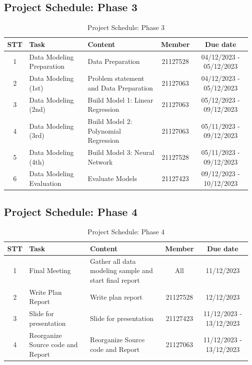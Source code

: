 \documentclass[13pt]{article}
\begin{document}
\subsection{Project Schedule: Phase 3}
\begin{table}[H]
    \centering
    \begin{tabular}{|c|p{4cm}|p{5cm}|c|c|}
    \hline
       \textbf{STT} & \textbf{Task} & \textbf{Content} & \textbf{Member} & \textbf{Due date}\\
    \hline
        1 & Data Modeling Preparation & Data Preparation & 21127528 & 04/12/2023 - 05/12/2023\\
    \hline
        2 & Data Modeling (1st) & Problem statement and Data Preparation & 21127063 & 04/12/2023 - 05/12/2023\\
    \hline
        3 & Data Modeling (2nd) & Build Model 1: Linear Regression & 21127063 & 05/12/2023 - 09/12/2023\\
    \hline
        4 & Data Modeling (3rd) & Build Model 2: Polynomial Regression & 21127063 & 05/11/2023 - 09/12/2023\\
    \hline
        5 & Data Modeling (4th) & Build Model 3: Neural Network & 21127528 & 05/11/2023 - 09/12/2023\\
    \hline
        6 & Data Modeling Evaluation & Evaluate Models & 21127423 & 09/12/2023 - 10/12/2023\\
    \hline
    \end{tabular}
    \caption{Project Schedule: Phase 3}
    \label{tab:mytable}
\end{table}


\subsection{Project Schedule: Phase 4}
\begin{table}[h]
    \centering
    \begin{tabular}{|c|p{4cm}|p{5cm}|c|c|}
    \hline
       \textbf{STT} & \textbf{Task} & \textbf{Content} & \textbf{Member} & \textbf{Due date}\\
    \hline
        1 & Final Meeting & Gather all data modeling sample and start final report & All & 11/12/2023\\
    \hline
        2 & Write Plan Report & Write plan report & 21127528 & 12/12/2023\\
    \hline
        3 & Slide for presentation & Slide for presentation & 21127423 & 11/12/2023 - 13/12/2023\\
    \hline
        4 & Reorganize Source code and Report & Reorganize Source code and Report & 21127063 & 11/12/2023 - 13/12/2023\\
    \hline
    \end{tabular}
    \caption{Project Schedule: Phase 4}
    \label{tab:mytable}
\end{table}
\end{document}

